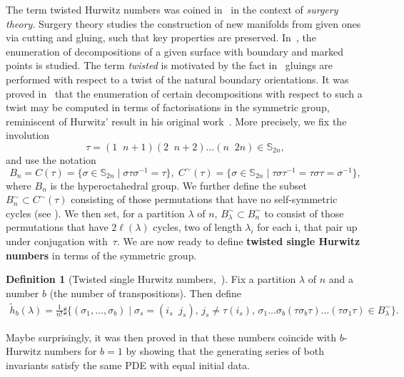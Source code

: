 \documentclass[11pt]{article}
\theoremstyle{definition}
\newtheorem{defi}[theo]{Definition}
\numberwithin{equation}{section}
\begin{document}
The term twisted Hurwitz numbers was coined in~\cite{BF21} in the context of \textit{surgery theory}. Surgery theory studies the construction of new manifolds from given ones via cutting and gluing, such that key properties are preserved. In~\cite{BF21}, the enumeration of decompositions of a given surface with boundary and marked points is studied. The term \textit{twisted} is motivated by the fact in~\cite{BF21} gluings are performed with respect to a twist of the natural boundary orientations. It was proved in~\cite{BF21} that the enumeration of certain decompositions with respect to such a twist may be computed in terms of factorisations in the symmetric group, reminiscent of Hurwitz' result in his original work~\cite{hurwitz1892algebraische}. More precisely, we fix the involution $$\tau= (1\;\; n+1) (2 \;\;n+2) \ldots (n \;\;2n)\in \mathbb{S}_{2n},$$ and use the notation
\begin{equation*}
    B_n=C(\tau)=\{\sigma \in \mathbb{S}_{2n} \mid  \sigma \tau \sigma^{-1}=\tau\}, \; C^\sim(\tau)=\{\sigma \in \mathbb{S}_{2n} \mid  \tau \sigma \tau^{-1} = \tau \sigma \tau =  \sigma^{-1}\},
\end{equation*}
where $B_n$ is the hyperoctahedral group. We further define the subset $B^\sim_n \subset C^\sim(\tau)$ consisting of those permutations that have no self-symmetric cycles (see \cite[Lemma~2.1]{BF21}). We then set, for a partition $\lambda$ of $n$,  $B^\sim_\lambda\subset B^\sim_n$ to consist of those permutations that have $2\ell(\lambda)$ cycles, two of length $\lambda_i$ for each i, that pair up under conjugation with~$\tau$. We are now ready to define \textbf{twisted single Hurwitz numbers} in terms of the symmetric group.

\begin{defi}[Twisted single Hurwitz numbers,~\cite{BF21}]
\label{def:twisthur}
Fix a partition $\lambda$ of $n$ and a number $b$ (the number of transpositions).
Then define
\begin{align*}
\tilde{h}_{b}(\lambda)= \frac{1}{n!}\sharp \Big\{(\sigma_1,\ldots,\sigma_b) \mid  \sigma_s=(i_s\;\;j_s),\, j_s\neq \tau(i_s),\, \sigma_1\ldots\sigma_b (\tau\sigma_b\tau)\ldots (\tau\sigma_1\tau) \in B^{\sim}_\lambda\Big\}.
\end{align*}
\end{defi}

Maybe surprisingly, it was then proved in \cite[Theorem 3.2]{BF21} that these numbers coincide with $b$-Hurwitz numbers for $b=1$ by showing that the generating series of both invariants satisfy the same PDE with equal initial data.
\end{document}
